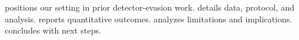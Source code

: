   positions our setting in prior detector-evasion work.  details data, protocol, and analysis.  reports quantitative outcomes.  analyzes limitations and implications.  concludes with next steps.
